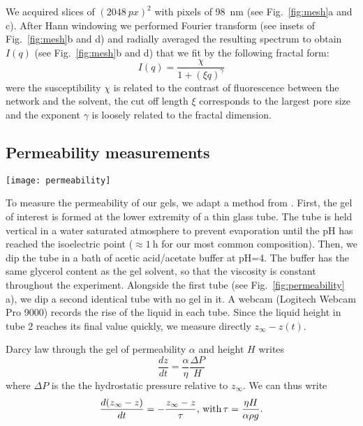 \documentclass[twocolumn,superscriptaddress,showpacs,preprintnumbers,amsmath,amssymb,prl]{revtex4-1}
\begin{document}
We acquired slices of $(\SI{2048}{px})^2$ with pixels of \SI{98}{\nano\metre} (see Fig.~\ref{fig:mesh}a and c). After Hann windowing we performed Fourier transform (see insets of Fig.~\ref{fig:mesh}b and d) and radially averaged the resulting spectrum to obtain $I(q)$ (see Fig.~\ref{fig:mesh}b and d) that we fit by the following fractal form:
\begin{equation}
I(q) = \frac{\chi}{1+(\xi q)^\gamma}
\end{equation}
were the susceptibility $\chi$ is related to the contrast of fluorescence between the network and the solvent, the cut off length $\xi$ corresponds to the largest pore size and the exponent $\gamma$ is loosely related to the fractal dimension. 

\subsection*{Permeability measurements}
\begin{figure*}
	\texttt{[image: permeability]}
	\caption{Permeability measurements. (a) Schematic representation of the experiment. (b-c) Evolution of the height of the interface in tube 1 relative to the final height in tube 2. Black line is the best exponential fit $Ae^{-t/\tau}$. (b) Gel is 4\%w casein, 4\%w GDL in water, $H=\SI{2.3}{\milli\metre}$ and $\tau=\SI{57}{\minute}$. (c) Idem in 50\%w glycerol, $H=\SI{4}{\milli\metre}$ and $\tau=\SI{100}{\hour}$.}
	\label{fig:permeability}
\end{figure*}

To measure the permeability of our gels, we adapt a method from \cite{VanDijk1986}. First, the gel of interest is formed at the lower extremity of a thin glass tube. The tube is held vertical in a water saturated atmosphere to prevent evaporation until the pH has reached the isoelectric point ($\approx\SI{1}{\hour}$ for our most common composition). Then, we dip the tube in a bath of acetic acid/acetate buffer at pH=4. The buffer has the same glycerol content as the gel solvent, so that the viscosity is constant throughout the experiment. Alongside the first tube (see Fig.~\ref{fig:permeability} a), we dip a second identical tube with no gel in it. A webcam (Logitech Webcam Pro 9000) records the rise of the liquid in each tube. Since the liquid height in tube 2 reaches its final value quickly, we measure directly $z_\infty-z(t)$.

Darcy law through the gel of permeability $\alpha$ and height $H$ writes
\begin{equation}
\frac{dz}{dt} = \frac{\alpha}{\eta}\frac{\Delta P}{H}
\end{equation}
where $\Delta P$ is the the hydrostatic pressure relative to $z_\infty$. We can thus write
\begin{equation}
\frac{d(z_\infty-z)}{dt} = -\frac{z_\infty-z}{\tau}\text{, with\,} \tau = \frac{\eta H}{\alpha \rho g}.
\end{equation}
\end{document}
